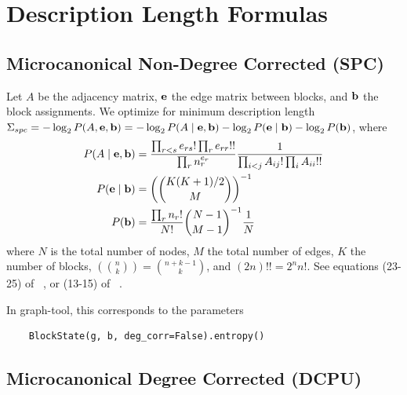 \documentclass[aps,pre,superscriptaddress]{revtex4}
\begin{document}
\section{Description Length Formulas}
\label{sbm-formulas}

\subsection*{Microcanonical Non-Degree Corrected (SPC)}

Let $A$ be the adjacency matrix, $\vb{e}$ the edge matrix between blocks, and $\vb{b}$ the block assignments.
We optimize for minimum description length $\Sigma_{spc} = -\log_2P(A, \vb{e}, \vb{b}) = -\log_2 P(A \mid \vb{e}, \vb{b}) - \log_2 P(\vb{e} \mid \vb{b}) - \log_2 P(\vb{b})$, where
\begin{align}
	P(A \mid \vb{e}, \vb{b}) & = \frac{\prod_{r < s} e_{rs}! \prod_{r} e_{rr}!!}{\prod_r n_r^{e_r}} \frac{1}{\prod_{i < j} A_{ij}! \prod_{i} A_{ii}!!} \\
	P(\vb{e} \mid \vb{b})    & = \left( \binom{K(K+1)/2}{M} \right)^{-1}                                                                               \\
	P(\vb{b})                & = \frac{\prod_r n_r!}{N!} \binom{N - 1}{M - 1}^{-1} \frac{1}{N}
\end{align}
where $N$ is the total number of nodes, $M$ the total number of edges, $K$ the number of blocks, $\left( \binom{n}{k} \right) = \binom{n + k - 1}{k}$, and $(2n)!! = 2^n n!$.
See equations (23-25) of ~\cite{peixoto17-01}, or (13-15) of ~\cite{funke19-04}.

In graph-tool, this corresponds to the parameters
\begin{verbatim}
    BlockState(g, b, deg_corr=False).entropy()
\end{verbatim}

\subsection*{Microcanonical Degree Corrected (DCPU)}
\end{document}
